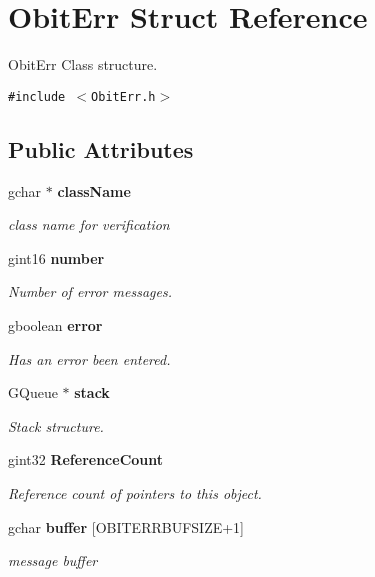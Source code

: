 \section{Obit\-Err Struct Reference}
\label{structObitErr}
Obit\-Err Class structure.  


{\tt \#include $<$Obit\-Err.h$>$}

\subsection*{Public Attributes}
\begin{CompactItemize}
\item 
gchar $\ast$ {\bf class\-Name}
\begin{CompactList}\small\item\em class name for verification \item\end{CompactList}\item 
gint16 {\bf number}
\begin{CompactList}\small\item\em Number of error messages. \item\end{CompactList}\item 
gboolean {\bf error}
\begin{CompactList}\small\item\em Has an error been entered. \item\end{CompactList}\item 
GQueue $\ast$ {\bf stack}
\begin{CompactList}\small\item\em Stack structure. \item\end{CompactList}\item 
gint32 {\bf Reference\-Count}
\begin{CompactList}\small\item\em Reference count of pointers to this object. \item\end{CompactList}\item 
gchar {\bf buffer} [OBITERRBUFSIZE+1]
\begin{CompactList}\small\item\em message buffer \item\end{CompactList}\end{CompactItemize}


